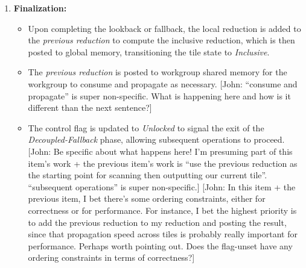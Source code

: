 \documentclass[sigconf]{acmart}
\newcommand{\john}[1]{{\footnotesize\color{cyan}[John: #1]}}
\begin{document}
\begin{enumerate}
  \item \textbf{Finalization:}
        \begin{itemize}
          \item Upon completing the lookback or fallback, the local reduction is added to the \emph{previous reduction} to compute the inclusive reduction, which is then posted to global memory, transitioning the tile state to \emph{Inclusive}.
          \item The \emph{previous reduction} is posted to workgroup shared memory for the workgroup to consume and propagate as necessary. \john{``consume and propagate'' is super non-specific. What is happening here and how is it different than the next sentence?}
          \item The control flag is updated to \emph{Unlocked} to signal the exit of the \emph{Decoupled-Fallback} phase, allowing subsequent operations to proceed. \john{Be specific about what happens here! I'm presuming part of this item's work + the previous item's work is ``use the previous reduction as the starting point for scanning then outputting our current tile''. ``subsequent operations'' is super non-specific.} \john{In this item + the previous item, I bet there's some ordering constraints, either for correctness or for performance. For instance, I bet the highest priority is to add the previous reduction to my reduction and posting the result, since that propagation speed across tiles is probably really important for performance. Perhaps worth pointing out. Does the flag-unset have any ordering constraints in terms of correctness?}
        \end{itemize}
\end{enumerate}
\end{document}
